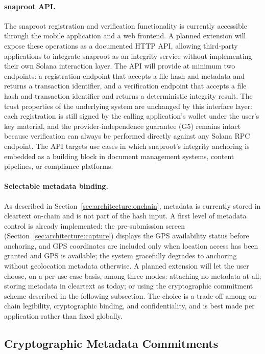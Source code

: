 \documentclass[11pt,a4paper]{article}
\begin{document}
\paragraph{snaproot API.} The snaproot registration and verification
functionality is currently accessible through the mobile application
and a web frontend. A planned extension will expose these operations
as a documented HTTP API, allowing third-party applications to
integrate snaproot as an integrity service without implementing their
own Solana interaction layer. The API will provide at minimum two
endpoints: a registration endpoint that accepts a file hash and
metadata and returns a transaction identifier, and a verification
endpoint that accepts a file hash and transaction identifier and
returns a deterministic integrity result. The trust properties of the
underlying system are unchanged by this interface layer: each
registration is still signed by the calling application's wallet
under the user's key material, and the provider-independence guarantee
(G5) remains intact because verification can always be performed
directly against any Solana RPC endpoint. The API targets use cases
in which snaproot's integrity anchoring is embedded as a building
block in document management systems, content pipelines, or
compliance platforms.

\paragraph{Selectable metadata binding.}
As described in Section~\ref{sec:architecture:onchain}, metadata is
currently stored in cleartext on-chain and is not part of the hash
input. A first level of metadata control is already implemented: the
pre-submission screen (Section~\ref{sec:architecture:capture})
displays the GPS availability status before anchoring, and GPS
coordinates are included only when location access has been granted
and GPS is available; the system gracefully degrades to anchoring
without geolocation metadata otherwise. A planned extension will let
the user choose, on a per-use-case basis, among three modes: attaching
no metadata at all; storing metadata in cleartext as today; or using
the cryptographic commitment scheme described in the following
subsection. The choice is a trade-off among on-chain legibility,
cryptographic binding, and confidentiality, and is best made per
application rather than fixed globally.

\subsection{Cryptographic Metadata Commitments}
\label{sec:limitations:metadata-commitments}
\end{document}
